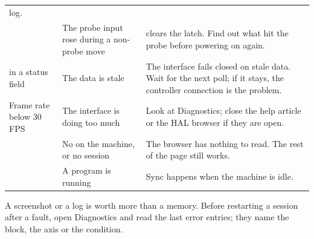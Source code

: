 \begin{longtable}{L{4.4cm}L{4.4cm}L{4.0cm}}
        log. \\
   & The probe input rose during a non-probe move &  clears the
        latch. Find out what hit the probe before powering on again. \\
   in a status field & The data is stale & The interface fails closed on stale data.
        Wait for the next poll; if it stays, the controller connection is the problem. \\
  Frame rate below 30 FPS & The interface is doing too much & Look at Diagnostics; close the
        help article or the HAL browser if they are open. \\
   & No  on the machine, or no session & The browser has
        nothing to read. The rest of the page still works. \\
   & A program is running & Sync happens when the machine is
        idle. \\
  \bottomrule
\end{longtable}

\begin{cautionbox}
  A screenshot or a log is worth more than a memory. Before restarting a session after a
  fault, open Diagnostics and read the last error entries; they name the block, the axis or the
  condition.
\end{cautionbox}
